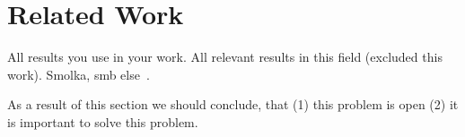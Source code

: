 \section{Related Work}

All results you use in your work.
All relevant results in this field (excluded this work).
Smolka, smb else~\cite{smolka2017regular, smolka2013regular, firsov2016cfl}. 

As a result of this section we should conclude, that (1) this problem is open (2) it is important to solve this problem.

